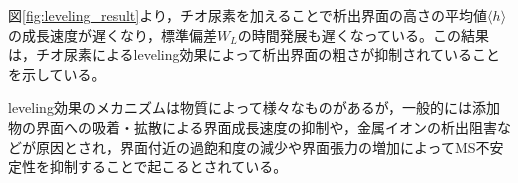 \documentclass[autodetect-engine,dvi=dvipdfmx,a4paper,ja=standard,oneside,openany,11pt]{bxjsbook}
\begin{document}
図\ref{fig:leveling_result}より，チオ尿素を加えることで析出界面の高さの平均値$\langle h\rangle$の成長速度が遅くなり，標準偏差$W_L$の時間発展も遅くなっている。この結果は，チオ尿素によるleveling効果によって析出界面の粗さが抑制されていることを示している。

leveling効果のメカニズムは物質によって様々なものがある\cite{めっき添加剤の作用機構と表面形状制御}が，一般的には添加物の界面への吸着・拡散による界面成長速度の抑制や，金属イオンの析出阻害などが原因とされ\cite{oniciu1991some}，界面付近の過飽和度の減少や界面張力の増加によってMS不安定性を抑制することで起こるとされている。

\ifdraft{
  
  
}{}
\end{document}
